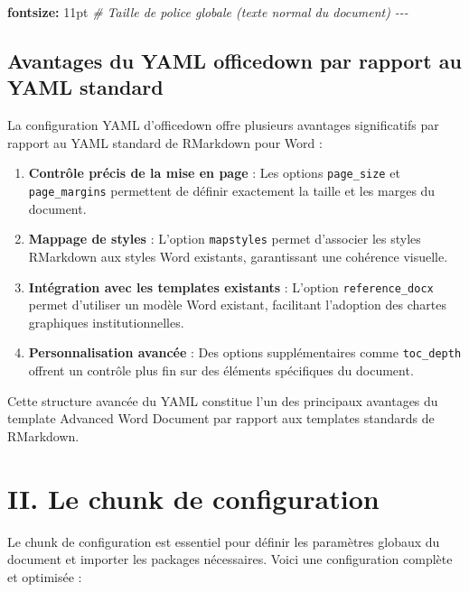 \documentclass[
]{article}
\newenvironment{Shaded}{\begin{snugshade}}{\end{snugshade}}
\newcommand{\AttributeTok}[1]{\textcolor[rgb]{0.13,0.29,0.53}{#1}}
\newcommand{\CommentTok}[1]{\textcolor[rgb]{0.56,0.35,0.01}{\textit{#1}}}
\newcommand{\FunctionTok}[1]{\textcolor[rgb]{0.13,0.29,0.53}{\textbf{#1}}}
\newcommand{\KeywordTok}[1]{\textcolor[rgb]{0.13,0.29,0.53}{\textbf{#1}}}
\newcommand{\PreprocessorTok}[1]{\textcolor[rgb]{0.56,0.35,0.01}{\textit{#1}}}
\begin{document}
\begin{Shaded}
\begin{Highlighting}[]
\AttributeTok{    }\FunctionTok{fontsize}\KeywordTok{:}\AttributeTok{ 11pt}\CommentTok{                    \# Taille de police globale (texte normal du document)}
\PreprocessorTok{{-}{-}{-}}
\end{Highlighting}
\end{Shaded}

\subsection{Avantages du YAML officedown par rapport au YAML
standard}\label{avantages-du-yaml-officedown-par-rapport-au-yaml-standard}

La configuration YAML d'officedown offre plusieurs avantages
significatifs par rapport au YAML standard de RMarkdown pour Word :

\begin{enumerate}
\def\labelenumi{\arabic{enumi}.}
\item
  \textbf{Contrôle précis de la mise en page} : Les options
  \texttt{page\_size} et \texttt{page\_margins} permettent de définir
  exactement la taille et les marges du document.
\item
  \textbf{Mappage de styles} : L'option \texttt{mapstyles} permet
  d'associer les styles RMarkdown aux styles Word existants,
  garantissant une cohérence visuelle.
\item
  \textbf{Intégration avec les templates existants} : L'option
  \texttt{reference\_docx} permet d'utiliser un modèle Word existant,
  facilitant l'adoption des chartes graphiques institutionnelles.
\item
  \textbf{Personnalisation avancée} : Des options supplémentaires comme
  \texttt{toc\_depth} offrent un contrôle plus fin sur des éléments
  spécifiques du document.
\end{enumerate}

Cette structure avancée du YAML constitue l'un des principaux avantages
du template Advanced Word Document par rapport aux templates standards
de RMarkdown.

\section{II. Le chunk de
configuration}\label{ii.-le-chunk-de-configuration}

Le chunk de configuration est essentiel pour définir les paramètres
globaux du document et importer les packages nécessaires. Voici une
configuration complète et optimisée :
\end{document}
